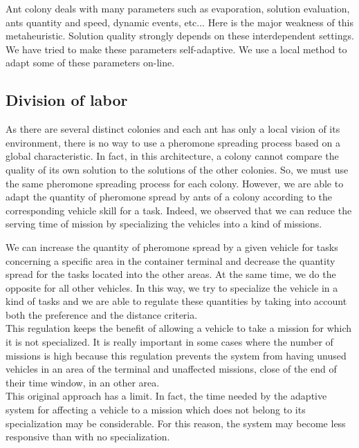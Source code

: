 \documentclass[journal]{IEEEtran}
\begin{document}
Ant colony deals with many parameters such as evaporation, solution evaluation, ants quantity and speed,
dynamic events, etc... Here is the major weakness of this metaheuristic. Solution quality strongly depends on these interdependent settings. %
We have tried to make these parameters self-adaptive. We use a local method to adapt some of these parameters on-line.

\subsection{Division of labor}
As there are several distinct colonies and each ant has only a local vision of its environment, there
is no way to use a pheromone spreading process based on a global characteristic.
In fact, in this architecture, a colony cannot compare the quality of its own
solution to the solutions of the other colonies. So, we must use the same
pheromone spreading process for each colony. However, we are able to adapt the
quantity of pheromone spread by ants of a colony according to the corresponding
vehicle skill for a task. Indeed, we observed that we can reduce the
serving time of mission by specializing the vehicles into a kind of missions.

We can increase the quantity of pheromone spread by
a given vehicle for tasks concerning a specific area in the
container terminal and decrease the quantity spread for the tasks located into
the other areas. At the same time, we do the opposite for all other vehicles. In this way, we try to specialize the vehicle in a kind of
tasks and we are able to regulate these quantities by taking into account both
the preference and the distance criteria.\\

This regulation keeps the benefit of allowing a vehicle to take a
mission for which it is not specialized. It is really important in some cases
where the number of missions is high because this regulation prevents the system
from having unused vehicles in an area of the terminal and unaffected missions,
close of the end of their time window, in an other area.\\

This original approach has a limit. In fact, the time needed by the adaptive
system for affecting a vehicle to a mission which does not belong to its
specialization may be considerable. For this reason, the system may become less
responsive than with no specialization.
\end{document}
